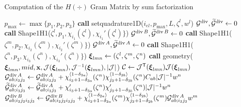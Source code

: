 \begin{algorithm}[ht!]
\caption{Computation of the $H(\div)$ Gram Matrix by sum factorization}\label{algo:hdivtensor}
\begin{algorithmic}
\State $p_{\max}\gets\max\{p_1,p_2,p_3\}$
\State\textbf{call }setquadrature1D($i_{el},p_{\max},L,\zeta^l,w^l$)
\State $\mathcal{G}^{\operatorname{div}},\widetilde{\mathcal{G}}^{\operatorname{div}}\gets 0$
    \State\textbf{call } Shape1H1($\zeta^l,p_1,\chi_{i_1}(\zeta^l),\chi_{i_1}'(\zeta^l)\}$) 
            \State $\mathcal{G}^{\operatorname{div} B},\widetilde{\mathcal{G}}^{\operatorname{div} B}\gets 0$
                \State\textbf{call } Shape1H1($\zeta^m,p_2,\chi_{i_2}(\zeta^m),\chi_{i_2}'(\zeta^m)\}$) 
                \State $\mathcal{G}^{\operatorname{div} A},\widetilde{\mathcal{G}}^{\operatorname{div} A}\gets 0$
                    \State\textbf{call } Shape1H1($\zeta^n,p_3,\chi_{i_3}(\zeta^n),\chi_{i_3}'(\zeta^n)\}$) 
                    \State $\boldsymbol{\xi}_{lmn}\gets (\zeta^l,\zeta^m,\zeta^n)$
                    \State\textbf{call } geometry( $\boldsymbol{\xi}_{lmn},mid,\mathbf{x},\mathcal{J}(\boldsymbol{\xi}_{lmn}),\mathcal{J}^{-1}(\boldsymbol{\xi}_{lmn}),|\mathcal{J}|$)
                    \State $\mathcal{C}\gets\mathcal{J}^{\mathsf{T}}(\boldsymbol{\xi}_{lmn})\mathcal{J}(\boldsymbol{\xi}_{lmn})$
                            \State$\mathcal{G}_{ab;i_3j_3}^{\operatorname{div} A}\gets \mathcal{G}_{ab;i_3j_3}^{\operatorname{div} A} + \chi_{i_3+1-\delta_{3a}}^{\langle1-\delta_{3a}\rangle}(\zeta^n) \chi_{j_3+1-\delta_{3b}}^{\langle1-\delta_{3b}\rangle}(\zeta^n) C_{ab} |\mathcal{J}|^{-1} w^n$ 
                            \State$\widetilde{\mathcal{G}}_{ab;i_3j_3}^{\operatorname{div} A}\gets \widetilde{\mathcal{G}}_{ab;i_3j_3}^{\operatorname{div} A} + \chi_{i_3+1-\delta_{3a}}'(\zeta^n) \chi_{j_3+1-\delta_{3b}}'(\zeta^n) |\mathcal{J}|^{-1} w^n$
                        \EndIf
                    \EndFor
                \EndFor
                                    \State$\mathcal{G}_{ab;i_2j_2i_3j_3}^{\operatorname{div} B}\gets \mathcal{G}_{ab;i_2j_2i_3j_3}^{\operatorname{div} B} + \chi_{i_2+1-\delta_{2a}}^{\langle1-\delta_{2a}\rangle}(\zeta^m) \chi_{j_2+1-\delta_{2b}}^{\langle1-\delta_{2b}\rangle}(\zeta^m) \mathcal{G}_{ab;i_3j_3}^{\operatorname{div} A} w^m$ \Comment{(\ref{GB_hdiv})}

\end{algorithmic}
\end{algorithm}
